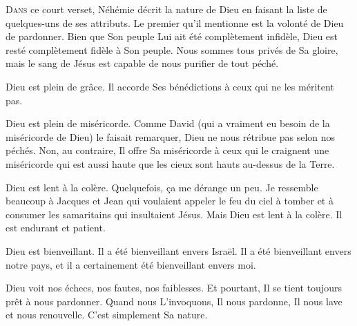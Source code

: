 \lettrine{D}{ans} ce court verset, Néhémie décrit la nature de Dieu
 en faisant la liste de quelques-uns de ses attributs.
 Le premier qu'il mentionne est la volonté de Dieu de pardonner.
 Bien que Son peuple Lui ait été complètement infidèle,
 Dieu est resté complètement fidèle à Son peuple.
 Nous sommes tous privés de Sa gloire,
 mais le sang de Jésus est capable de nous purifier de tout péché.


Dieu est plein de grâce.
 Il accorde Ses bénédictions à ceux qui ne les méritent pas.

Dieu est plein de miséricorde.
 Comme David (qui a vraiment eu besoin de la miséricorde de Dieu)
 le faisait remarquer, Dieu ne nous rétribue pas selon nos péchés.
 Non, au contraire, Il offre Sa miséricorde à ceux qui le craignent
 \ocadr{}une miséricorde qui est aussi haute que les cieux sont hauts
 au-dessus de la Terre.

Dieu est lent à la colère. Quelquefois, \c{c}a me dérange un peu.
 Je ressemble beaucoup à Jacques et Jean qui voulaient appeler
 le feu du ciel à tomber et à consumer les samaritains qui insultaient Jésus.
 Mais Dieu est lent à la colère. Il est endurant et patient.

Dieu est bienveillant. Il a été bienveillant envers Israël.
 Il a été bienveillant envers notre pays,
 et il a certainement été bienveillant envers moi.

Dieu voit nos échecs, nos fautes, nos faiblesses.
 Et pourtant, Il se tient toujours prêt à nous pardonner.
 Quand nous L'invoquons, Il nous pardonne,
 Il nous lave et nous renouvelle. C'est simplement Sa nature.

\dvrule







